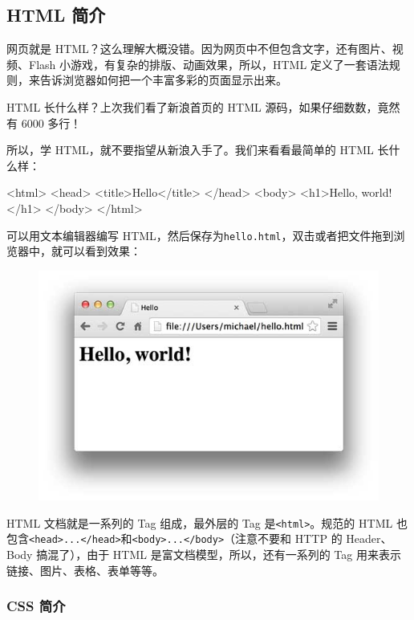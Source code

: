 \hypertarget{html-ux7b80ux4ecb}{%
\subsection{HTML 简介}\label{html-ux7b80ux4ecb}}

网页就是
HTML？这么理解大概没错。因为网页中不但包含文字，还有图片、视频、Flash
小游戏，有复杂的排版、动画效果，所以，HTML
定义了一套语法规则，来告诉浏览器如何把一个丰富多彩的页面显示出来。

HTML 长什么样？上次我们看了新浪首页的 HTML 源码，如果仔细数数，竟然有
6000 多行！

所以，学 HTML，就不要指望从新浪入手了。我们来看看最简单的 HTML
长什么样：

\begin{pythoncode}
<html>
<head>
  <title>Hello</title>
</head>
<body>
  <h1>Hello, world!</h1>
</body>
</html>
\end{pythoncode}

可以用文本编辑器编写
HTML，然后保存为\texttt{hello.html}，双击或者把文件拖到浏览器中，就可以看到效果：

 
 \begin{figure}[htp]
	\centering
	\includegraphics[width=0.6\linewidth]{fig/950569639986880.png}
\end{figure}


HTML 文档就是一系列的 Tag 组成，最外层的 Tag
是\texttt{\textless{}html\textgreater{}}。规范的 HTML
也包含\texttt{\textless{}head\textgreater{}...\textless{}/head\textgreater{}}和\texttt{\textless{}body\textgreater{}...\textless{}/body\textgreater{}}（注意不要和
HTTP 的 Header、Body 搞混了），由于 HTML
是富文档模型，所以，还有一系列的 Tag
用来表示链接、图片、表格、表单等等。

\hypertarget{css-ux7b80ux4ecb}{%
\subsubsection{CSS 简介}\label{css-ux7b80ux4ecb}}


